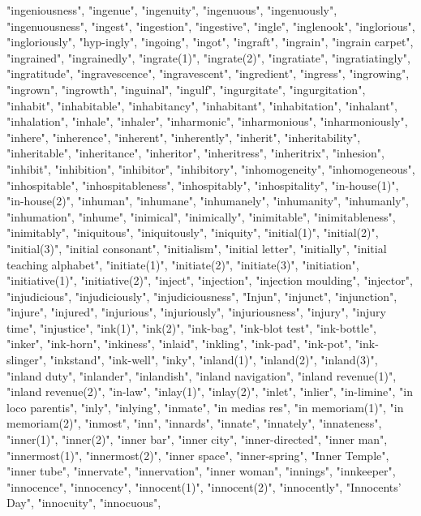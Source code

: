 "ingeniousness",
"ingenue",
"ingenuity",
"ingenuous",
"ingenuously",
"ingenuousness",
"ingest",
"ingestion",
"ingestive",
"ingle",
"inglenook",
"inglorious",
"ingloriously",
"hyp-ingly",
"ingoing",
"ingot",
"ingraft",
"ingrain",
"ingrain carpet",
"ingrained",
"ingrainedly",
"ingrate(1)",
"ingrate(2)",
"ingratiate",
"ingratiatingly",
"ingratitude",
"ingravescence",
"ingravescent",
"ingredient",
"ingress",
"ingrowing",
"ingrown",
"ingrowth",
"inguinal",
"ingulf",
"ingurgitate",
"ingurgitation",
"inhabit",
"inhabitable",
"inhabitancy",
"inhabitant",
"inhabitation",
"inhalant",
"inhalation",
"inhale",
"inhaler",
"inharmonic",
"inharmonious",
"inharmoniously",
"inhere",
"inherence",
"inherent",
"inherently",
"inherit",
"inheritability",
"inheritable",
"inheritance",
"inheritor",
"inheritress",
"inheritrix",
"inhesion",
"inhibit",
"inhibition",
"inhibitor",
"inhibitory",
"inhomogeneity",
"inhomogeneous",
"inhospitable",
"inhospitableness",
"inhospitably",
"inhospitality",
"in-house(1)",
"in-house(2)",
"inhuman",
"inhumane",
"inhumanely",
"inhumanity",
"inhumanly",
"inhumation",
"inhume",
"inimical",
"inimically",
"inimitable",
"inimitableness",
"inimitably",
"iniquitous",
"iniquitously",
"iniquity",
"initial(1)",
"initial(2)",
"initial(3)",
"initial consonant",
"initialism",
"initial letter",
"initially",
"initial teaching alphabet",
"initiate(1)",
"initiate(2)",
"initiate(3)",
"initiation",
"initiative(1)",
"initiative(2)",
"inject",
"injection",
"injection moulding",
"injector",
"injudicious",
"injudiciously",
"injudiciousness",
"Injun",
"injunct",
"injunction",
"injure",
"injured",
"injurious",
"injuriously",
"injuriousness",
"injury",
"injury time",
"injustice",
"ink(1)",
"ink(2)",
"ink-bag",
"ink-blot test",
"ink-bottle",
"inker",
"ink-horn",
"inkiness",
"inlaid",
"inkling",
"ink-pad",
"ink-pot",
"ink-slinger",
"inkstand",
"ink-well",
"inky",
"inland(1)",
"inland(2)",
"inland(3)",
"inland duty",
"inlander",
"inlandish",
"inland navigation",
"inland revenue(1)",
"inland revenue(2)",
"in-law",
"inlay(1)",
"inlay(2)",
"inlet",
"inlier",
"in-limine",
"in loco parentis",
"inly",
"inlying",
"inmate",
"in medias res",
"in memoriam(1)",
"in memoriam(2)",
"inmost",
"inn",
"innards",
"innate",
"innately",
"innateness",
"inner(1)",
"inner(2)",
"inner bar",
"inner city",
"inner-directed",
"inner man",
"innermost(1)",
"innermost(2)",
"inner space",
"inner-spring",
"Inner Temple",
"inner tube",
"innervate",
"innervation",
"inner woman",
"innings",
"innkeeper",
"innocence",
"innocency",
"innocent(1)",
"innocent(2)",
"innocently",
"Innocents' Day",
"innocuity",
"innocuous",
